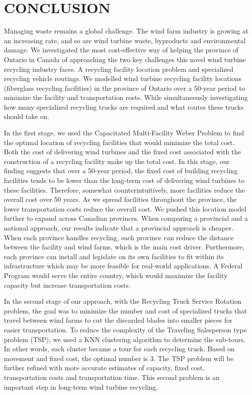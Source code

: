 \section*{CONCLUSION}
Managing waste remains a global challenge. The wind farm industry is growing at an increasing rate, and so are wind turbine waste, byproducts and environmental damage. We investigated the most cost-effective way of helping the province of Ontario in Canada of approaching the two key challenges this novel wind turbine recycling industry faces. A recycling facility location problem and specialized recycling vehicle routings. We modelled wind turbine recycling facility locations (fiberglass recycling facilities) in the province of Ontario over a 50-year period to minimize the facility and transportation costs. While simultaneously investigating how many specialized recycling trucks are required and what routes these trucks should take on.   

In the first stage, we used the Capacitated Multi-Facility Weber Problem to find the optimal location of recycling facilities that would minimize the total cost. Both the cost of delivering wind turbines and the fixed cost associated with the construction of a recycling facility make up the total cost. In this stage, our finding suggests that over a 50-year period, the fixed cost of building recycling facilities tends to be lower than the long-term cost of delivering wind turbines to these facilities. Therefore, somewhat counterintuitively, more facilities reduce the overall cost over 50 years. As we spread facilities throughout the province, the lower transportation costs reduce the overall cost. We pushed this location model further to expand across Canadian provinces. When comparing a provincial and a national approach, our results indicate that a provincial approach is cheaper. When each province handles recycling, each province can reduce the distance between the facility and wind farms, which is the main cost driver. Furthermore, each province can install and legislate on its own facilities to fit within its infrastructure which may be more feasible for real-world applications. A Federal Program would serve the entire country, which would maximize the facility capacity but increase transportation costs.  

In the second stage of our approach, with the Recycling Truck Service Rotation problem, the goal was to minimize the number and cost of specialized trucks that travel between wind farms to cut the discarded blades into smaller pieces for easier transportation. To reduce the complexity of the Traveling Salesperson type problem (TSP), we used a KNN clustering algorithm to determine the sub-tours. In other words, each cluster became a tour for each recycling truck. Based on movement and fixed cost, the optimal number is 3. The TSP problem will be further refined with more accurate estimates of capacity, fixed cost, transportation costs and transportation time. This second problem is an important step in long-term wind turbine recycling.  

